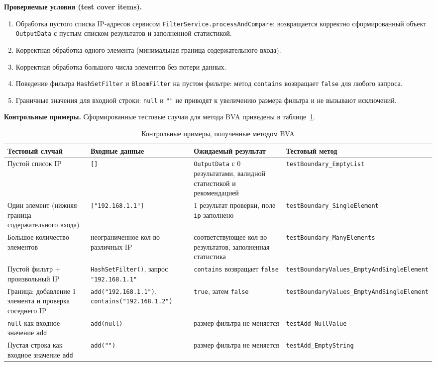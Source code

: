 \textbf{Проверяемые условия (test cover items).}
\begin{enumerate}
    \item Обработка пустого списка IP-адресов сервисом \texttt{FilterService.processAndCompare}: возвращается корректно сформированный объект \texttt{OutputData} с пустым списком результатов и заполненной статистикой.
    \item Корректная обработка одного элемента (минимальная граница содержательного входа).
    \item Корректная обработка большого числа элементов без потери данных.
    \item Поведение фильтра \texttt{HashSetFilter} и \texttt{BloomFilter} на пустом фильтре: метод \texttt{contains} возвращает \texttt{false} для любого запроса.
    \item Граничные значения для входной строки: \texttt{null} и \texttt{""} не приводят к увеличению размера фильтра и не вызывают исключений.
\end{enumerate}

\textbf{Контрольные примеры.} Сформированные тестовые случаи для метода BVA приведены в таблице~\ref{tab:bva-cases}.

\begin{table}[ht]
\centering\small
\caption{Контрольные примеры, полученные методом BVA}
\label{tab:bva-cases}
\begin{tabular}{|p{3.6cm}|p{4.0cm}|p{4.0cm}|p{2.6cm}|}
\hline
\textbf{Тестовый случай} & \textbf{Входные данные} & \textbf{Ожидаемый результат} & \textbf{Тестовый метод} \\
\hline
Пустой список IP & \texttt{[]} & \texttt{OutputData} с 0 результатами, валидной статистикой и рекомендацией & \texttt{testBoundary\_Empty\-List} \\
\hline
Один элемент (нижняя граница содержательного входа) & \texttt{["192.168.1.1"]} & 1 результат проверки, поле \texttt{ip} заполнено & \texttt{testBoundary\_Single\-Element} \\
\hline
Большое количество элементов & неограниченное кол-во различных IP & соответствующее кол-во результатов, заполненная статистика & \texttt{testBoundary\_Many\-Elements} \\
\hline
Пустой фильтр + произвольный IP & \texttt{HashSetFilter()}, запрос \texttt{"192.168.1.1"} & \texttt{contains} возвращает \texttt{false} & \texttt{testBoundary\-Values\_Empty\-And\-SingleElement} \\
\hline
Граница: добавление 1 элемента и проверка соседнего IP & \texttt{add("192.168.1.1")}, \texttt{contains("192.168.1.2")} & \texttt{true}, затем \texttt{false} & \texttt{testBoundary\-Values\_Empty\-And\-SingleElement} \\
\hline
\texttt{null} как входное значение \texttt{add} & \texttt{add(null)} & размер фильтра не меняется & \texttt{testAdd\_Null\-Value} \\
\hline
Пустая строка как входное значение \texttt{add} & \texttt{add("")} & размер фильтра не меняется & \texttt{testAdd\_Empty\-String} \\
\hline
\end{tabular}
\end{table}

